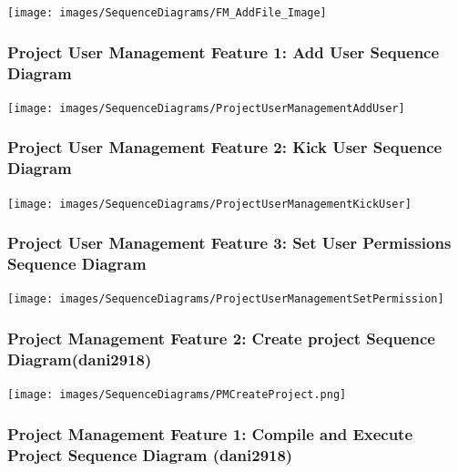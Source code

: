 \documentclass[twoside,letterpaper]{article}
\begin{document}
	\texttt{[image: images/SequenceDiagrams/FM\_AddFile\_Image]}
	
	\newpage
	
	\subsubsection[Project User Management Feature 1: Add User Sequence Diagram]{\rmfamily\bfseries\color{black}
		Project User Management Feature 1: Add User Sequence Diagram}
	\hypertarget{RefHeading22059017292}{}
	
	\texttt{[image: images/SequenceDiagrams/ProjectUserManagementAddUser]}
	
	\newpage
	
	\subsubsection[Project User Management Feature 2: Kick User Sequence Diagram]{\rmfamily\bfseries\color{black}
		Project User Management Feature 2: Kick User Sequence Diagram}
	\hypertarget{RefHeading22059017292}{}
	\texttt{[image: images/SequenceDiagrams/ProjectUserManagementKickUser]}
	\newpage
	
	\subsubsection[Project User Management Feature 3: Set User Permissions Sequence Diagram]{\rmfamily\bfseries\color{black}
		Project User Management Feature 3: Set User Permissions Sequence Diagram}
	\hypertarget{RefHeading22059017292}{}
	\texttt{[image: images/SequenceDiagrams/ProjectUserManagementSetPermission]}
	\newpage
	
	\subsubsection[Project Management Feature 2: Create project Sequence Diagram (dani2918)]{\rmfamily\bfseries\color{black}
		Project Management Feature 2: Create project Sequence Diagram(dani2918)}
	
	\bigskip
	
	\texttt{[image: images/SequenceDiagrams/PMCreateProject.png]}
	\label{pm:sd3}
	\newpage

	\subsubsection[Project Management Feature 1: Sequence Diagram 1: Compile and execute project (dani2918)]{\rmfamily\bfseries\color{black}
		Project Management Feature 1: Compile and Execute Project Sequence Diagram (dani2918) }
	
\end{document}
